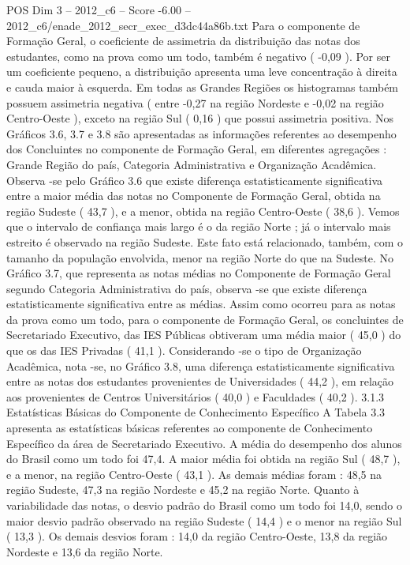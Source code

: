 \begin{textsample}{POS Dim 3 – 2012\_c6 – Score -6.00 – 2012\_c6/enade\_2012\_secr\_exec\_d3dc44a86b.txt}
Para o componente de Formação Geral, o coeficiente de assimetria da distribuição das notas dos estudantes, como na prova como um todo, também é negativo ( -0,09 ).
Por ser um coeficiente pequeno, a distribuição apresenta uma leve concentração à direita e cauda maior à esquerda.
Em todas as Grandes Regiões os histogramas também possuem assimetria negativa ( entre -0,27 na região Nordeste e -0,02 na região Centro-Oeste ), exceto na região Sul ( 0,16 ) que possui assimetria positiva.
Nos Gráficos 3.6, 3.7 e 3.8 são apresentadas as informações referentes ao desempenho dos Concluintes no componente de Formação Geral, em diferentes agregações : Grande Região do país, Categoria Administrativa e Organização Acadêmica.
Observa -se pelo Gráfico 3.6 que existe diferença estatisticamente significativa entre a maior média das notas no Componente de Formação Geral, obtida na região Sudeste ( 43,7 ), e a menor, obtida na região Centro-Oeste ( 38,6 ).
Vemos que o intervalo de confiança mais largo é o da região Norte ; já o intervalo mais estreito é observado na região Sudeste.
Este fato está relacionado, também, com o tamanho da população envolvida, menor na região Norte do que na Sudeste.
No Gráfico 3.7, que representa as notas médias no Componente de Formação Geral segundo Categoria Administrativa do país, observa -se que existe diferença estatisticamente significativa entre as médias.
Assim como ocorreu para as notas da prova como um todo, para o componente de Formação Geral, os concluintes de Secretariado Executivo, das IES Públicas obtiveram uma média maior ( 45,0 ) do que os das IES Privadas ( 41,1 ).
Considerando -se o tipo de Organização Acadêmica, nota -se, no Gráfico 3.8, uma diferença estatisticamente significativa entre as notas dos estudantes provenientes de Universidades ( 44,2 ), em relação aos provenientes de Centros Universitários ( 40,0 ) e Faculdades ( 40,2 ). 3.1.3 Estatísticas Básicas do Componente de Conhecimento Específico A Tabela 3.3 apresenta as estatísticas básicas referentes ao componente de Conhecimento Específico da área de Secretariado Executivo.
A média do desempenho dos alunos do Brasil como um todo foi 47,4.
A maior média foi obtida na região Sul ( 48,7 ), e a menor, na região Centro-Oeste ( 43,1 ).
As demais médias foram : 48,5 na região Sudeste, 47,3 na região Nordeste e 45,2 na região Norte.
Quanto à variabilidade das notas, o desvio padrão do Brasil como um todo foi 14,0, sendo o maior desvio padrão observado na região Sudeste ( 14,4 ) e o menor na região Sul ( 13,3 ).
Os demais desvios foram : 14,0 da região Centro-Oeste, 13,8 da região Nordeste e 13,6 da região Norte.

\end{textsample}
